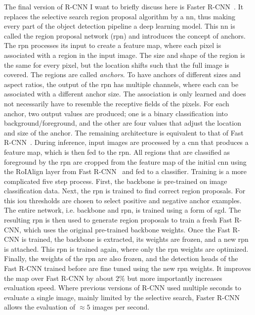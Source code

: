 The final version of R-CNN I want to briefly discuss here is Faster R-CNN~\cite{Ren:2015aaa}. It replaces the selective search region proposal algorithm by a \acrshort{nn}, thus making every part of the object detection pipeline a deep learning model. This \acrshort{nn} is called the region proposal network (\acrshort{rpn}) and introduces the concept of anchors. The \acrshort{rpn} processes its input to create a feature map, where each pixel is associated with a region in the input image. The size and shape of the region is the same for every pixel, but the location shifts such that the full image is covered. The regions are called \emph{anchors}. To have anchors of different sizes and aspect ratios, the output of the \acrshort{rpn} has multiple channels, where each can be associated with a different anchor size. The association is only learned and does not necessarily have to resemble the receptive fields of the pixels. For each anchor, two output values are produced; one is a binary classification into background/foreground, and the other are four values that adjust the location and size of the anchor. The remaining architecture is equivalent to that of Fast R-CNN~\cite{Girshick:2015aaa}. During inference, input images are processed by a \acrshort{cnn} that produces a feature map, which is then fed to the \acrshort{rpn}. All regions that are classified as foreground by the \acrshort{rpn} are cropped from the feature map of the initial \acrshort{cnn} using the RoIAlign layer from Fast R-CNN~\cite{Girshick:2015aaa} and fed to a classifier. Training is a more complicated five step process. First, the backbone is pre-trained on image classification data. Next, the \acrshort{rpn} is trained to find correct region proposals. For this \acrshort{iou} thresholds are chosen to select positive and negative anchor examples. The entire network, i.e. backbone and \acrshort{rpn}, is trained using a form of \acrshort{sgd}. The resulting \acrshort{rpn} is then used to generate region proposals to train a fresh Fast R-CNN, which uses the original pre-trained backbone weights. Once the Fast R-CNN is trained, the backbone is extracted, its weights are frozen, and a new \acrshort{rpn} is attached. This \acrshort{rpn} is trained again, where only the \acrshort{rpn} weights are optimized. Finally, the weights of the \acrshort{rpn} are also frozen, and the detection heads of the Fast R-CNN trained before are fine tuned using the new \acrshort{rpn} weights. It improves the \acrshort{map} over Fast R-CNN by about $2\%$ but more importantly increases evaluation speed. Where previous versions of R-CNN used multiple seconds to evaluate a single image, mainly limited by the selective search, Faster R-CNN allows the evaluation of $\approx 5$ images per second.

